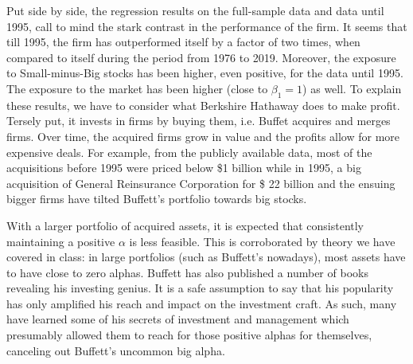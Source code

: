\documentclass[10pt]{article}
\newenvironment{exercise}[2][Exercise]{\begin{trivlist}
  \item[\hskip \labelsep {\bfseries #1}\hskip \labelsep {\bfseries #2.}]}{\end{trivlist}}
\begin{document}
\begin{exercise}{3}
  Put side by side, the regression results on the full-sample data and data
  until 1995, call to mind the stark contrast in the performance of the firm. It
  seems that till 1995, the firm has outperformed itself by a factor of two
  times, when compared to itself during the period from 1976 to 2019.
  Moreover, the exposure to Small-minus-Big stocks has been higher, even
  positive, for the data until 1995. The exposure to the market  has been 
  higher (close to $\beta_1 = 1$) as well. To explain these results, we have to consider
  what Berkshire Hathaway does to make profit. Tersely put, it invests in firms
  by buying them, i.e. Buffet acquires and merges firms. Over time, the acquired
  firms grow in value and the profits allow for more expensive deals. For
  example, from the publicly available data, most of the acquisitions before
  1995 were priced below \$1 billion while in 1995, a big acquisition of General
  Reinsurance Corporation for \$ 22 billion and the ensuing bigger firms have
  tilted Buffett's portfolio towards big stocks.
  
  With a larger portfolio of acquired assets, it is expected that consistently maintaining
   a positive $\alpha$ is less feasible. This is corroborated by
  theory we have covered in class: in large portfolios (such as Buffett's nowadays),
  most assets have to have close to zero alphas. Buffett has also published a
  number of books revealing his investing genius. It is a safe assumption to
  say that his popularity has only amplified his reach and impact on the
  investment craft. As such, many have learned some of his secrets of investment
  and management which presumably allowed them to reach for those positive
  alphas for themselves, canceling out Buffett's uncommon big alpha.

\end{exercise}
  
\end{document}
